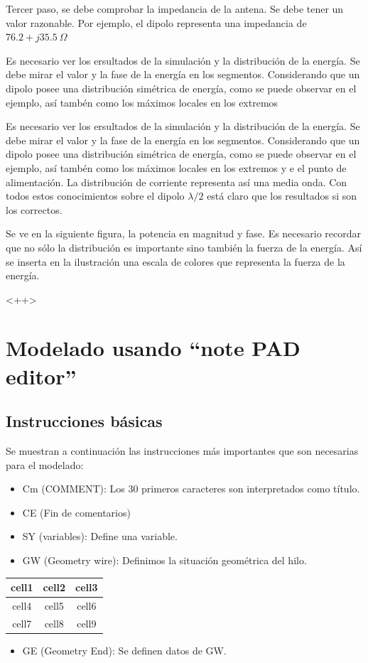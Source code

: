 \documentclass[12pt]{article}
\begin{document}
Tercer paso, se debe comprobar la impedancia de la antena. Se debe tener un
valor razonable. Por ejemplo, el dipolo representa una impedancia de
$76.2+j35.5\ \Omega$

Es necesario ver los ersultados de la simulaci\'on y la distribuci\'on de la energ\'ia. Se debe mirar el valor y la fase de la energ\'ia en los segmentos. Considerando que un dipolo posee una distribuci\'on sim\'etrica de energ\'ia, como se puede observar en el ejemplo, as\'i tamb\'en como los m\'aximos locales en los extremos

Es necesario ver los ersultados de la simulaci\'on y la distribuci\'on de la
energ\'ia. Se debe mirar el valor y la fase de la energ\'ia en los segmentos.
Considerando que un dipolo posee una distribuci\'on sim\'etrica de energ\'ia,
como se puede observar en el ejemplo, as\'i tamb\'en como los m\'aximos locales
en los extremos y e el punto de alimentaci\'on. La distribuci\'on de corriente representa as\'i una media onda. Con todos estos conocimientos sobre el dipolo $\lambda/2$ est\'a claro que los resultados si son los correctos.

Se ve en la siguiente figura, la potencia en magnitud y fase. Es necesario recordar que no s\'olo la distribuci\'on es importante sino tambi\'en la fuerza de la energ\'ia. As\'i se inserta en la ilustraci\'on una escala de colores que representa la fuerza de la energ\'ia.

<++> %

\section{Modelado usando ``note PAD editor''}

\subsection{Instrucciones b\'asicas}

Se muestran a continuaci\'on las instrucciones m\'as importantes que son necesarias para el modelado:

\begin{itemize}
    \item Cm (COMMENT): Los 30 primeros caracteres son interpretados como título.
    \item CE (Fin de comentarios)
    \item SY (variables): Define una variable.
    \item GW (Geometry wire): Definimos la situación geométrica del hilo.
\end{itemize}

\begin{center}
    \begin{tabular}{|c|c|c|}
	\hline
	cell1 & cell2 & cell3 \\\hline
	cell4 & cell5 & cell6 \\\hline  
	cell7 & cell8 & cell9 \\
	\hline
    \end{tabular}
\end{center}

\begin{itemize}%
    \item GE (Geometry End): Se definen datos de GW.
\end{itemize}
\end{document}
